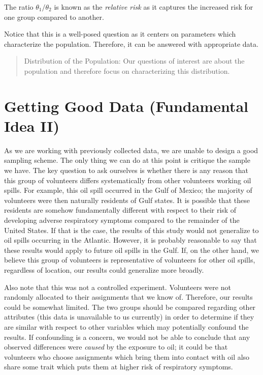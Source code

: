 \documentclass[
  letterpaper,
  DIV=11,
  numbers=noendperiod]{scrreprt}
\theoremstyle{definition}
\theoremstyle{definition}
\theoremstyle{plain}
\theoremstyle{remark}
\begin{document}
The ratio \(\theta_1/\theta_2\) is known as the \emph{relative risk} as
it captures the increased risk for one group compared to another.

Notice that this is a well-posed question as it centers on parameters
which characterize the population. Therefore, it can be answered with
appropriate data.

\begin{quote}
Distribution of the Population: Our questions of interest are about the
population and therefore focus on characterizing this distribution.
\end{quote}

\hypertarget{getting-good-data-fundamental-idea-ii}{%
\section{Getting Good Data (Fundamental Idea
II)}\label{getting-good-data-fundamental-idea-ii}}

As we are working with previously collected data, we are unable to
design a good sampling scheme. The only thing we can do at this point is
critique the sample we have. The key question to ask ourselves is
whether there is any reason that this group of volunteers differs
systematically from other volunteers working oil spills. For example,
this oil spill occurred in the Gulf of Mexico; the majority of
volunteers were then naturally residents of Gulf states. It is possible
that these residents are somehow fundamentally different with respect to
their risk of developing adverse respiratory symptoms compared to the
remainder of the United States. If that is the case, the results of this
study would not generalize to oil spills occurring in the Atlantic.
However, it is probably reasonable to say that these results would apply
to future oil spills in the Gulf. If, on the other hand, we believe this
group of volunteers is representative of volunteers for other oil
spills, regardless of location, our results could generalize more
broadly.

Also note that this was not a controlled experiment. Volunteers were not
randomly allocated to their assignments that we know of. Therefore, our
results could be somewhat limited. The two groups should be compared
regarding other attributes (this data is unavailable to us currently) in
order to determine if they are similar with respect to other variables
which may potentially confound the results. If confounding is a concern,
we would not be able to conclude that any observed differences were
\emph{caused} by the exposure to oil; it could be that volunteers who
choose assignments which bring them into contact with oil also share
some trait which puts them at higher risk of respiratory symptoms.
\end{document}
